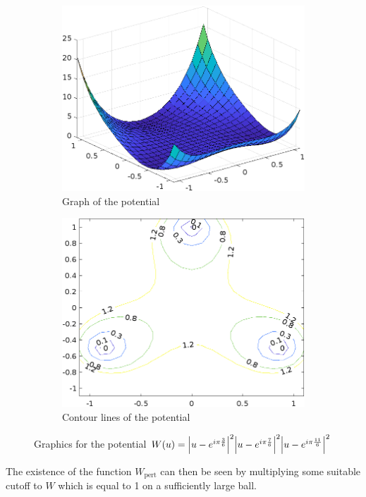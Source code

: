 \begin{figure}[h]
	\centering
	
	\begin{subfigure}[b]{0.45\linewidth}
		
		\includegraphics[width=\textwidth]{trianglepotentialsurf}
		\caption{Graph of the potential}
		\label{subfigure_epsilon}
	\end{subfigure}
	\hfill
	\begin{subfigure}[b]{0.45\linewidth}
		\includegraphics[width=\textwidth]{trianglecontour2d}
		
		\caption{Contour lines of the potential}
		\label{subfigure_varepsilon_prime}
	\end{subfigure}
	
	\caption{Graphics for the potential
	$ W ( u ) = 
	\abs{ u  - e^{ i \pi\frac{ 3 }{ 6 }} }^{ 2 } 
	\abs{ u  - e^{ i \pi\frac{   7}{ 6  }} }^{ 2 }
	\abs{ u  - e^{ i \pi\frac{  11}{ 6  }} }^{ 2 }$ }
	\label{twodimensional_potential}
\end{figure} 
The existence of the function $ W_{ \mathrm{pert} } $ can then be seen by 
multiplying some suitable cutoff to $ W 
$ which is equal to 1 on a sufficiently large ball.

